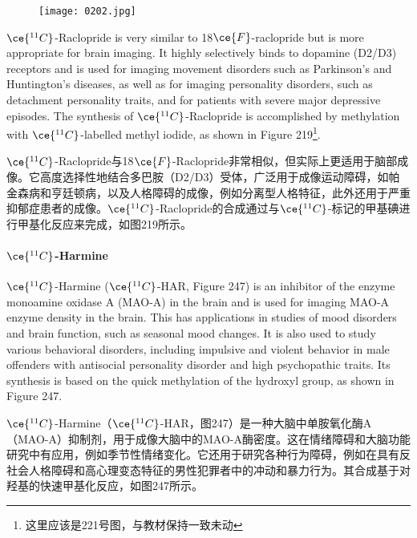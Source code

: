 \documentclass[dvipsnames, svgnames,a4paper,11pt]{article}
\begin{document}
\setcounter{figure}{245}


\begin{wrapfigure}{r}{0.4\textwidth}
    \centering
    \texttt{[image: 0202.jpg]}
     \label{fig246a}

\end{wrapfigure}

\(\ce{^{11}C}\)-Raclopride is very similar to 18\(\ce{F}\)-raclopride but is more appropriate for brain imaging. It highly selectively binds to dopamine (D2/D3) receptors and is used for imaging movement disorders such as Parkinson's and Huntington's diseases, as well as for imaging personality disorders, such as detachment personality traits, and for patients with severe major depressive episodes. The synthesis of \(\ce{^{11}C}\)-Raclopride is accomplished by methylation with \(\ce{^{11}C}\)-labelled methyl iodide, as shown in Figure 219\footnote{这里应该是221号图，与教材保持一致未动}.

\(\ce{^{11}C}\)-Raclopride与18\(\ce{F}\)-Raclopride非常相似，但实际上更适用于脑部成像。它高度选择性地结合多巴胺（D2/D3）受体，广泛用于成像运动障碍，如帕金森病和亨廷顿病，以及人格障碍的成像，例如分离型人格特征，此外还用于严重抑郁症患者的成像。\(\ce{^{11}C}\)-Raclopride的合成通过与\(\ce{^{11}C}\)-标记的甲基碘进行甲基化反应来完成，如图219所示。

\paragraph{\(\ce{^{11}C}\)-Harmine}  
\(\ce{^{11}C}\)-Harmine (\(\ce{^{11}C}\)-HAR, Figure 247) is an inhibitor of the enzyme monoamine oxidase A (MAO-A) in the brain and is used for imaging MAO-A enzyme density in the brain. This has applications in studies of mood disorders and brain function, such as seasonal mood changes. It is also used to study various behavioral disorders, including impulsive and violent behavior in male offenders with antisocial personality disorder and high psychopathic traits. Its synthesis is based on the quick methylation of the hydroxyl group, as shown in Figure 247.

\(\ce{^{11}C}\)-Harmine（\(\ce{^{11}C}\)-HAR，图247）是一种大脑中单胺氧化酶A（MAO-A）抑制剂，用于成像大脑中的MAO-A酶密度。这在情绪障碍和大脑功能研究中有应用，例如季节性情绪变化。它还用于研究各种行为障碍，例如在具有反社会人格障碍和高心理变态特征的男性犯罪者中的冲动和暴力行为。其合成基于对羟基的快速甲基化反应，如图247所示。
\end{document}
